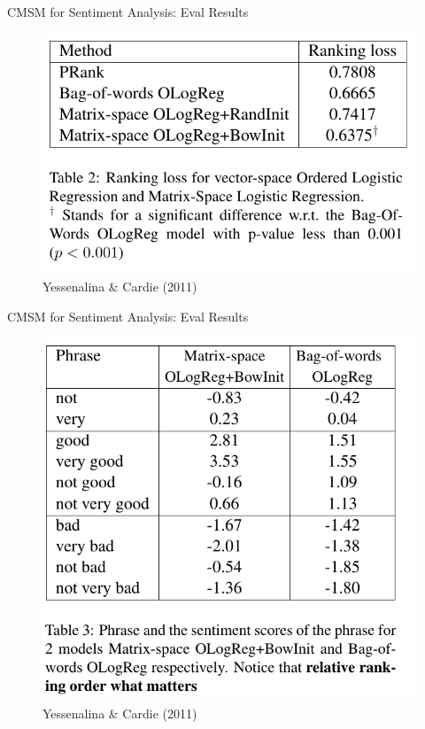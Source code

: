 \documentclass[12pt,a4paper]{beamer}
\begin{document}
\begin{frame}{CMSM for Sentiment Analysis: Eval Results}

\begin{figure}
\includegraphics[width=\textwidth]{cmsm_for_se_table2.png}
\caption{Yessenalina \&  Cardie (2011)}
\end{figure}
\end{frame}


\begin{frame}{CMSM for Sentiment Analysis: Eval Results}
\begin{figure}
\includegraphics[scale=0.45]{cmsm_for_se_table3.png}
\caption{Yessenalina \&  Cardie (2011)}
\end{figure}

\end{frame}
\end{document}
